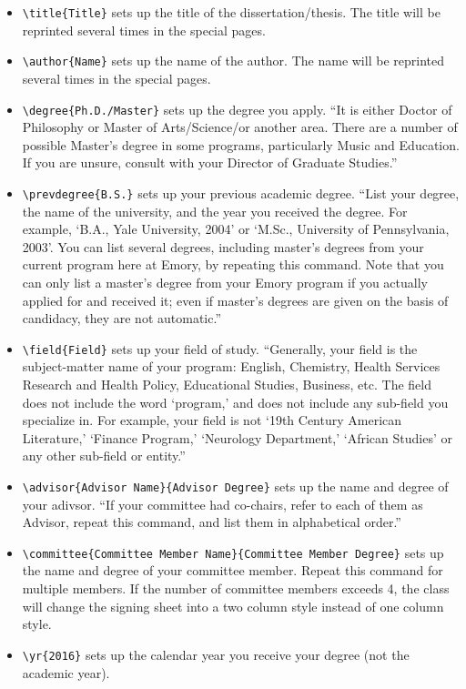 \documentclass[draft]{emory}
\begin{document}
\begin{itemize}
\item \Verb|\title{Title}| sets up the title of the dissertation/thesis. The title 
will be reprinted several times in the special pages.
\item \Verb|\author{Name}| sets up the name of the author. The name will be reprinted
several times in the special pages. 
\item \Verb|\degree{Ph.D./Master}| sets up the degree you apply. ``It is either Doctor
of Philosophy or Master of Arts/Science/or another area.  There are a number of 
possible Master's degree in some programs, particularly Music and Education.  
If you are unsure, consult with your Director of Graduate Studies.''\cite{emory-style}
\item \Verb|\prevdegree{B.S.}| sets up your previous academic degree. ``List your 
degree, the name of the university, and the year you received the degree.  
For example, `B.A., Yale University, 2004' or `M.Sc., University of Pennsylvania, 2003'.
You can list several degrees, including master's degrees from your current 
program here at Emory, by repeating this command.
Note that you can only list a master's degree from your
Emory program if you actually applied for and received it; even if master's 
degrees are given on the basis of candidacy, they are not automatic.''\cite{emory-style} 
\item \Verb|\field{Field}| sets up your field of study. ``Generally, 
your field is the subject-matter name of your program: English, Chemistry, 
Health Services Research and Health Policy, Educational Studies, Business, etc.  
The field does not include the word `program,' and does not include any sub-field
you specialize in.  For example, your field is not `19th Century American Literature,'
`Finance Program,' `Neurology Department,' `African Studies' or any other
sub-field or entity.''\cite{emory-style}
\item \Verb|\advisor{Advisor Name}{Advisor Degree}| sets up the name and degree of your 
adivsor. ``If your committee had co-chairs, refer to each of them as Advisor,
repeat this command, and list them in alphabetical order.''\cite{emory-style} 
\item \Verb|\committee{Committee Member Name}{Committee Member Degree}|  sets up
the name and degree of your committee member. Repeat this command for multiple 
members. If the number of committee members exceeds 4, the class will change
the signing sheet into a two column style instead of one column style.
\item \Verb|\yr{2016}| sets up the calendar year you receive your degree
(not the academic year).
\end{itemize}
\end{document}
